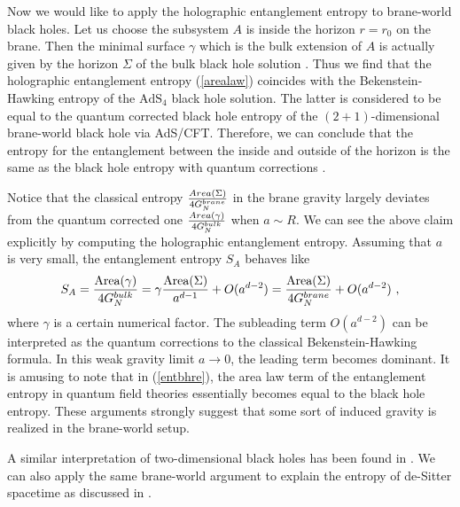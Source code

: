 \documentclass[12pt]{article}
\def\frac#1#2{{#1\over #2}}
\def\f {\frac}
\def\frac#1#2{{#1\over #2}}
\def\be{\begin{equation}}
\def\ee{\end{equation}}
\begin{document}
Now we would like
to apply the holographic entanglement entropy to brane-world black holes.
Let us choose the subsystem $A$ is inside the horizon $r=r_0$ on the brane. Then the minimal surface $\gamma$
which is the bulk extension of $A$ is actually given by the horizon $\Sigma$ of the bulk black hole
solution \cite{EHM}. Thus we find that the holographic entanglement entropy (\ref{arealaw}) coincides with the
Bekenstein-Hawking entropy of the $\mathrm{AdS}_4$ black hole solution. The latter is considered to be
equal to the quantum corrected black hole entropy of the $(2+1)$-dimensional brane-world black hole via AdS/CFT.
Therefore, we can conclude that the entropy for the entanglement between the inside and outside of the horizon is
the same as the black hole entropy with quantum corrections \cite{Emparan:2006ni,HMS}.

Notice that the classical entropy $\f{Area(\Sigma)}{4G^{brane}_{N}}$ in the brane gravity largely deviates from the quantum corrected one
$\f{Area(\gamma)}{4G^{bulk}_{N}}$ when $a\sim R$.
We can see the above claim explicitly by computing the holographic entanglement entropy.
Assuming that $a$ is very small, the entanglement entropy $S_A$ behaves like
\be
S_A=\f{\mbox{Area}(\gamma)}{4G^{bulk}_N}=\gamma\f{\mbox{Area}(\Sigma)}{a^{d-1}}+O(a^{d-2})=
\f{\mbox{Area}(\Sigma)}{4G^{brane}_{N}}+O(a^{d-2})\ ,\label{entbhre}
\ee
where $\gamma$ is a certain numerical factor. The subleading term $O(a^{d-2})$ can be interpreted as
the quantum corrections to the classical Bekenstein-Hawking formula. In this weak gravity limit $a\to 0$, the leading term becomes dominant. It is amusing to note that in (\ref{entbhre}), the area law term of the entanglement
entropy in quantum field theories essentially becomes equal to the black hole entropy.
These arguments strongly suggest that some sort of induced gravity is realized in the brane-world setup.

A similar interpretation of two-dimensional black holes has been found in \cite{Solodukhin:2006xv}.
We can also apply the same brane-world argument to explain the entropy of de-Sitter spacetime as
discussed in \cite{HMS,Iwashita:2006zj}.
\end{document}
